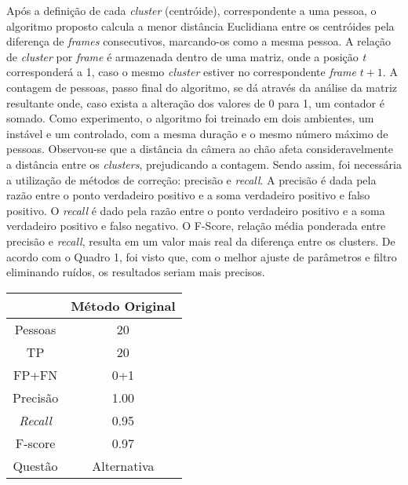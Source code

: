 \documentclass[12pt,oneside,a4paper,chapter=TITLE,section=TITLE,sumario=tradicional]{abntex2}
\begin{document}
Após a definição de cada \textit{cluster} (centróide), correspondente a uma pessoa, o algoritmo proposto calcula a menor distância Euclidiana entre os centróides pela diferença de \textit{frames} consecutivos, marcando-os como a mesma pessoa.
A relação de \textit{cluster} por \textit{frame} é armazenada dentro de uma matriz, onde a posição \textit{t} corresponderá a 1, caso o mesmo \textit{cluster} estiver no correspondente \textit{frame} $t+1$. A contagem de pessoas, passo final do algoritmo, se dá através da análise da matriz resultante onde, caso exista a alteração dos valores de 0 para 1, um contador é somado.
Como experimento, o algoritmo foi treinado em dois ambientes, um instável e um controlado, com a mesma duração e o mesmo número máximo de pessoas. Observou-se que a distância da câmera ao chão afeta consideravelmente a distância entre os \textit{clusters}, prejudicando a contagem. Sendo assim, foi necessária a utilização de métodos de correção: precisão e \textit{recall}. A precisão é dada pela razão entre o ponto verdadeiro positivo e a soma verdadeiro positivo e falso positivo. O \textit{recall} é dado pela razão entre o ponto verdadeiro positivo e a soma verdadeiro positivo e falso negativo. O F-Score, relação média ponderada entre precisão e \textit{recall}, resulta em um valor mais real da diferença entre os clusters.
De acordo com o Quadro 1, foi visto que, com o melhor ajuste de parâmetros e filtro eliminando ruídos, os resultados seriam mais precisos.

\begin{quadro}[htb]
    \begin{tabular}{|c|c|}
        \hline
        \textbf{} & \textbf{Método Original}\\ 
        \hline\hline
        Pessoas & 20\\ \hline
        TP  & 20\\ \hline
        FP+FN    & 0+1\\ \hline
        Precisão  & 1.00\\ \hline
        \textit{Recall}  & 0.95\\ \hline
        F-score & 0.97\\ \hline
        Questão & Alternativa\\ \hline
    \end{tabular}
    
\end{quadro}
\end{document}
